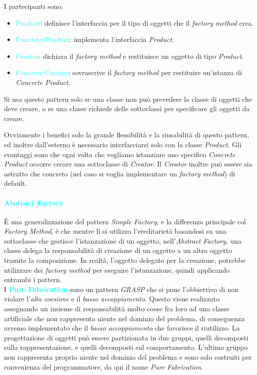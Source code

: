 I partecipanti sono:
\begin{itemize}
    \item \textcolor{cyan}{Product}: definisce l'interfaccia per il tipo
        di oggetti che il \emph{factory method} crea.
    \item \textcolor{cyan}{Concrete Product}: implementa l'interfaccia \emph{Product}.
    \item \textcolor{cyan}{Creator}: dichiara il \emph{factory method} e restituisce un oggetto
        di tipo \emph{Product}.
    \item \textcolor{cyan}{Concrete Creator}: sovrascrive il \emph{factory method} per restituire un'istanza
        di \emph{Concrete Product}.
\end{itemize}

Si usa questo pattern solo se una classe non può prevedere la classe di oggetti che deve creare,
o se una classe richiede delle sottoclassi per specificare gli oggetti da creare.

Ovviamente i benefici solo la grande flessibilità e la riusabilità di questo pattern, ed inoltre dall'esterno
è necessario interfacciarsi solo con la classe \emph{Product}. Gli svantaggi sono che ogni volta che vogliamo
istanziare uno specifico \emph{Concrete Product} occorre creare una sottoclasse di \emph{Creator}. Il \emph{Creator} inoltre
può essere sia astratto che concreto (nel caso si voglia implementare un \emph{factory method}) di default.

\paragraph{\textcolor{cyan}{Abstract Factory}} È una generalizzazione del pattern \emph{Simple Factory}, e la differenza principale col
\emph{Factory Method}, è che mentre lì si utilizza l'ereditarietà basandosi su una sottoclasse che gestisce l'istanzazione di un oggetto,
nell'\emph{Abstract Factory}, una classe delega la responsabilità di creazione di un oggetto a un altro oggetto tramite
la composizione. In realtà, l'oggetto delegato per la creazione, potrebbe utilizzare dei \emph{factory method} per eseguire l'istanzazione, quindi
applicando entrambi i pattern. \\

I \textbf{\textcolor{cyan}{Pure Fabrication}} sono un pattern \emph{GRASP} che si pone l'obbiettivo
di non violare l'\emph{alta coesione} e il \emph{basso accoppiamento}. Questo viene realizzato
assegnando un insieme di responsabilità molto coese fra loro ad una classe artificiale che non rappresenta
niente nel dominio del problema, di conseguenza avremo implementato che il \emph{basso accoppiamento} che favorisce
il riutilizzo.
La progettazione di oggetti può essere partizionata in due gruppi, quelli decomposti sulla rappresentazione, e quelli decomposti
sul comportamento. L'ultimo gruppo non rappresenta proprio niente nel dominio del problema e sono solo costruiti per convenienza
del programmatore, da qui il nome \emph{Pure Fabrication}.

